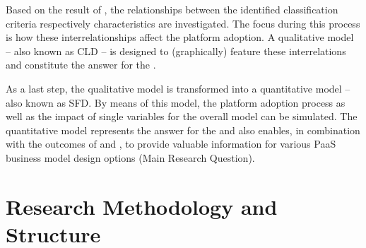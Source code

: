 Based on the result of , the relationships between the identified classification criteria respectively characteristics are investigated. The focus during this process is how these interrelationships affect the platform adoption. A qualitative model -- also known as \ac{CLD} -- is designed to (graphically) feature these interrelations and constitute the answer for the .

As a last step, the qualitative model is transformed into a quantitative model -- also known as \ac{SFD}. By means of this model, the platform adoption process as well as the impact of single variables for the overall model can be simulated. The quantitative model represents the answer for the  and also enables, in combination with the outcomes of  and , to provide valuable information for various \ac{PaaS} business model design options (Main Research Question).
	
\section{Research Methodology and Structure}\label{ch:intro:met}

